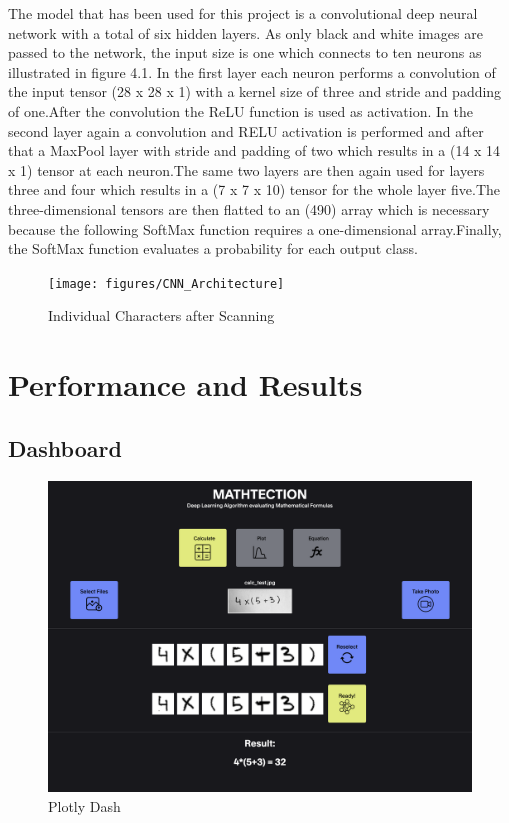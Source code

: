 \documentclass[@CLASSOPTIONS@]{tumarticle}
\begin{document}
The model that has been used for this project is a convolutional deep neural network with a total of six hidden layers.
As only black and white images are passed to the network, the input size is one which connects to ten neurons as
illustrated in figure 4.1. In the first layer each neuron performs a convolution of the input tensor (28 x 28 x 1) with
a kernel size of three and stride and padding of one.After the convolution the ReLU function is used as activation.
In the second layer again a convolution and RELU activation is performed and after that a MaxPool layer with stride and
padding of two which results in a (14 x 14 x 1) tensor at each neuron.The same two layers are then again used for
layers three and four which results in a (7 x 7 x 10) tensor for the whole layer five.The three-dimensional tensors are
then flatted to an (490) array which is necessary because the following SoftMax function requires a one-dimensional
array.Finally, the SoftMax function evaluates a probability for each output class.

\begin{figure}
    \begin{minipage}{0.48\textwidth}
     \centering
     \texttt{[image: figures/CNN\_Architecture]}
     \caption{Individual Characters after Scanning}\label{Fig:CNN_A}
   \end{minipage}
\end{figure}

\section{Performance and Results}
\label{sec:customization}

\subsection{Dashboard}

\begin{figure}
    \begin{minipage}{0.48\textwidth}
     \centering
     \includegraphics[width=.9\linewidth]{figures/dash}
     \caption{Plotly Dash}\label{Fig:Dash}
   \end{minipage}
\end{figure}
\end{document}
